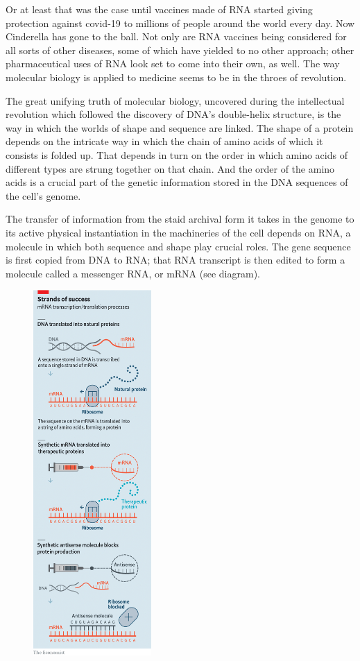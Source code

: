 \documentclass{article}
\begin{document}
Or at least that was the case until vaccines made of RNA started giving protection against covid-19 to millions of people around the world every day. Now Cinderella has gone to the ball. Not only are RNA vaccines being considered for all sorts of other diseases, some of which have yielded to no other approach; other pharmaceutical uses of RNA look set to come into their own, as well. The way molecular biology is applied to medicine seems to be in the throes of revolution. 

The great unifying truth of molecular biology, uncovered during the intellectual revolution which followed the discovery of DNA's double-helix structure, is the way in which the worlds of shape and sequence are linked. The shape of a protein depends on the intricate way in which the chain of amino acids of which it consists is folded up. That depends in turn on the order in which amino acids of different types are strung together on that chain. And the order of the amino acids is a crucial part of the genetic information stored in the DNA sequences of the cell's genome. 

The transfer of information from the staid archival form it takes in the genome to its active physical instantiation in the machineries of the cell depends on RNA, a molecule in which both sequence and shape play crucial roles. The gene sequence is first copied from DNA to RNA; that RNA transcript is then edited to form a molecule called a messenger RNA, or mRNA (see diagram). 

\begin{figure}[h]
\centering
\includegraphics[width=0.4\textwidth]{images/20210327_FBC001.png}
\end{figure}
\end{document}

